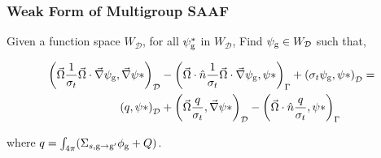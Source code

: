 \subsubsection{Weak Form of Multigroup SAAF}

Given a function space $W_\mathcal{D}$, for all $\psi^*_{\mathrm{g}}$ in $W_\mathcal{D}$, Find $\psi_{\mathrm{g}} \in W_\mathcal{D}$ such that,

\begin{align*}
        \left ( \vec{\Omega}\frac{1}{\sigma_t}\vec{\Omega}\cdot \vec{\nabla}\psi_{\mathrm{g}}, \vec{\nabla}\psi* \right)_\mathcal{D} &-     \left ( \vec{\Omega}\cdot \hat{n} \frac{1}{\sigma_t}\vec{\Omega} \cdot \vec{\nabla} \psi_{\mathrm{g}},\psi* \right)_{\Gamma} + \left ( \sigma_t \psi_{\mathrm{g}}, \psi* \right )_\mathcal{D} = \\
        \left ( q, \psi* \right)_\mathcal{D} &+ \left ( \vec{\Omega} \frac{q}{\sigma_t}, \vec{\nabla}\psi* \right)_\mathcal{D} - \left ( \vec{\Omega}\cdot \hat{n} \frac{q}{\sigma_t}, \psi* \right)_{\Gamma} 
\end{align*}

where $q = \int_{4\pi}(\Sigma_{s, \mathrm{g} \rightarrow \mathrm{g}'}\phi_{\mathrm{g}} + Q)$.
